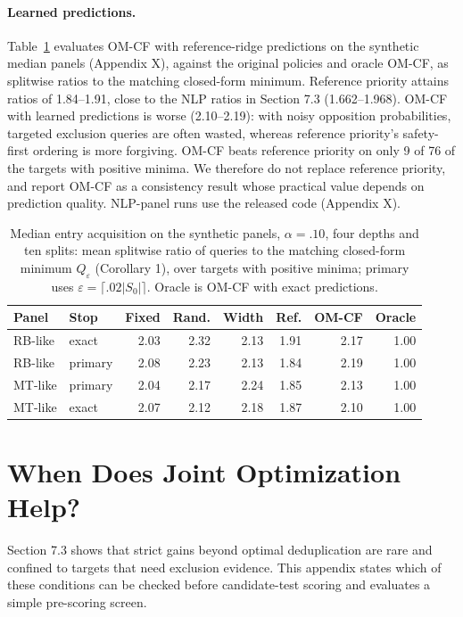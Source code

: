 \documentclass[11pt]{article}
\newcommand{\Sz}{S_0}
\begin{document}
\paragraph{Learned predictions.} Table~\ref{tab:omcf} evaluates OM-CF with reference-ridge predictions on the synthetic median panels (Appendix X), against the original policies and oracle OM-CF, as splitwise ratios to the matching closed-form minimum. Reference priority attains ratios of 1.84--1.91, close to the NLP ratios in Section 7.3 (1.662--1.968). OM-CF with learned predictions is worse (2.10--2.19): with noisy opposition probabilities, targeted exclusion queries are often wasted, whereas reference priority's safety-first ordering is more forgiving. OM-CF beats reference priority on only 9 of 76 of the targets with positive minima. We therefore do not replace reference priority, and report OM-CF as a consistency result whose practical value depends on prediction quality. NLP-panel runs use the released code (Appendix X).

\begin{table}[t]
\centering\footnotesize
\setlength{\tabcolsep}{1.5pt}
\begin{tabular}{@{}ll rrrrrr@{}}
\toprule
Panel & Stop & Fixed & Rand. & Width & Ref. & OM-CF & Oracle\\
\midrule
RB-like & exact & 2.03 & 2.32 & 2.13 & 1.91 & 2.17 & 1.00\\
RB-like & primary & 2.08 & 2.23 & 2.13 & 1.84 & 2.19 & 1.00\\
MT-like & primary & 2.04 & 2.17 & 2.24 & 1.85 & 2.13 & 1.00\\
MT-like & exact & 2.07 & 2.12 & 2.18 & 1.87 & 2.10 & 1.00\\
\bottomrule
\end{tabular}
\caption{Median entry acquisition on the synthetic panels, $\alpha=.10$, four depths and ten splits: mean splitwise ratio of queries to the matching closed-form minimum $Q_\varepsilon$ (Corollary 1), over targets with positive minima; primary uses $\varepsilon=\lceil.02|\Sz|\rceil$. Oracle is OM-CF with exact predictions.}
\label{tab:omcf}
\end{table}

\section{When Does Joint Optimization Help?}
\label{app:predict}
Section 7.3 shows that strict gains beyond optimal deduplication are rare and confined to targets that need exclusion evidence. This appendix states which of these conditions can be checked before candidate-test scoring and evaluates a simple pre-scoring screen.
\end{document}
